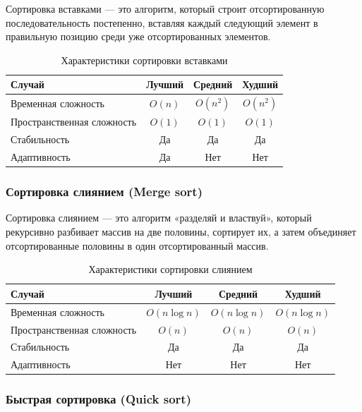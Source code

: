 \documentclass[a4paper,12pt]{article}
\begin{document}
Сортировка вставками --- это алгоритм, который строит отсортированную последовательность постепенно, вставляя каждый следующий элемент в правильную позицию среди уже отсортированных элементов.

\begin{table}[H]
    \centering
    \begin{tabular}{|l|c|c|c|}
        \hline
        Случай & Лучший & Средний & Худший \\
        \hline
        Временная сложность & $O(n)$ & $O(n^2)$ & $O(n^2)$ \\
        \hline
        Пространственная сложность & $O(1)$ & $O(1)$ & $O(1)$ \\
        \hline
        Стабильность & Да & Да & Да \\
        \hline
        Адаптивность & Да & Нет & Нет \\
        \hline
    \end{tabular}
    \caption{Характеристики сортировки вставками}
\end{table}

\subsubsection{Сортировка слиянием (Merge sort)}
\label{subsubsec:сортировка-слиянием-merge-sort}

Сортировка слиянием --- это алгоритм «разделяй и властвуй», который рекурсивно разбивает массив на две половины, сортирует их, а затем объединяет отсортированные половины в один отсортированный массив.

\begin{table}[H]
    \centering
    \begin{tabular}{|l|c|c|c|}
        \hline
        Случай & Лучший & Средний & Худший \\
        \hline
        Временная сложность & $O(n \log n)$ & $O(n \log n)$ & $O(n \log n)$ \\
        \hline
        Пространственная сложность & $O(n)$ & $O(n)$ & $O(n)$ \\
        \hline
        Стабильность & Да & Да & Да \\
        \hline
        Адаптивность & Нет & Нет & Нет \\
        \hline
    \end{tabular}
    \caption{Характеристики сортировки слиянием}
\end{table}

\subsubsection{Быстрая сортировка (Quick sort)}
\label{subsubsec:быстрая-сортировка-quick-sort}
\end{document}
